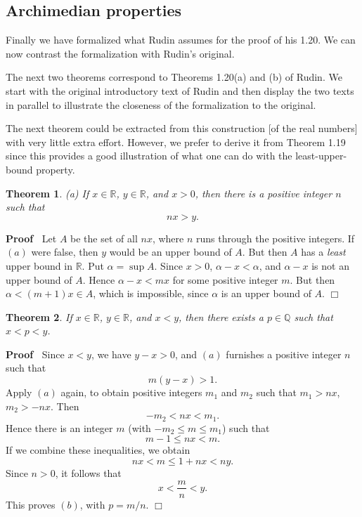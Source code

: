 \documentclass{article}
\newenvironment{proof}{\noindent\textbf{Proof\ }}{\hspace*{\fill}$\Box$\medskip}
\newtheorem{theorem}{Theorem}
\begin{document}
\subsection{Archimedian properties}
Finally we have formalized what Rudin assumes for the proof of his 1.20. We can now contrast the formalization with Rudin's original.

\newpage
The next two theorems correspond to Theorems 1.20(a) and (b) of Rudin. We start with the original introductory text of Rudin and then display the two texts in parallel to illustrate the closeness of the formalization to the original.

\vspace{1cm}

The next theorem could be extracted from this construction [of the real numbers] with very little extra effort. However, we prefer to derive it from Theorem 1.19 since this provides a good illustration of what one can do with the least-upper-bound property.

\begin{multicols}{2}



\begin{theorem}
(a) If $x\in \mathbb{R}$, $y\in \mathbb{R}$, and $x>0$, then there is a positive integer $n$ such that
$$n x > y.$$
\end{theorem}
\begin{proof}
Let $A$ be the set of all $n x$, where $n$ runs through the positive integers. If $(a)$ were false, then $y$ would be an upper bound of $A$. But then $A$ has a \emph{least} upper bound in $\mathbb{R}$.
Put $\alpha=\sup A$. Since $x>0$, $\alpha-x<\alpha$, and $\alpha-x$ is not an upper bound of $A$. Hence $\alpha-x<m x$ for some positive integer $m$. But then $\alpha<(m+1) x \in A$, which is impossible, since $\alpha$ is an upper bound of $A$.
\end{proof}

\end{multicols}
\newpage
\begin{multicols}{2}



\columnbreak

\begin{theorem}
If $x\in\mathbb{R}$, $y\in\mathbb{R}$, and $x<y$, then there exists
a $p\in\mathbb{Q}$ such that $x<p<y$.
\end{theorem}
\begin{proof}
Since $x < y$, we have $y-x>0$, and $(a)$ furnishes a positive integer $n$ such that
$$m (y-x) > 1.$$
Apply $(a)$ again, to obtain positive integers $m_1$ and $m_2$ such that
$m_1 > n x$, $m_2 > -n x$. Then
$$-m_2 <n x < m_1.$$
Hence there is an integer $m$ (with $-m_2 \leq m \leq m_1$) such that
$$m-1 \leq n x < m.$$
If we combine these inequalities, we obtain
$$n x < m \leq 1 + n x < n y.$$
Since $n > 0$, it follows that
$$x < \frac{m}{n} < y.$$
This proves $(b)$, with $p = m/n$.
\end{proof}

\end{multicols}
\end{document}
